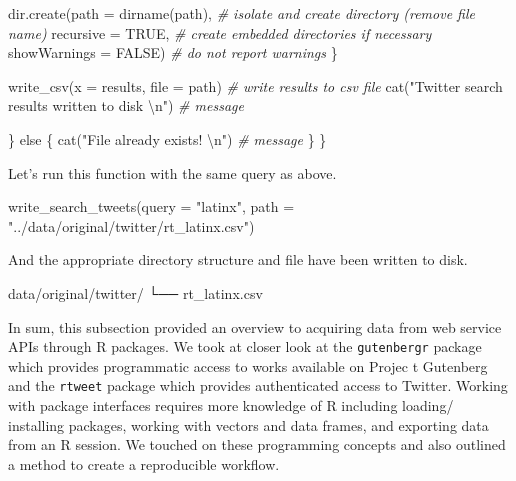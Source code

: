 \documentclass[
  letterpaper,
]{scrbook}
\newenvironment{Shaded}{\begin{snugshade}}{\end{snugshade}}
\newcommand{\AttributeTok}[1]{\textcolor[rgb]{0.00,0.00,0.00}{#1}}
\newcommand{\CommentTok}[1]{\textcolor[rgb]{0.00,0.00,0.00}{\textit{#1}}}
\newcommand{\ConstantTok}[1]{\textcolor[rgb]{0.00,0.00,0.00}{#1}}
\newcommand{\ControlFlowTok}[1]{\textcolor[rgb]{0.00,0.00,0.00}{#1}}
\newcommand{\ExtensionTok}[1]{\textcolor[rgb]{0.00,0.00,0.00}{#1}}
\newcommand{\FunctionTok}[1]{\textcolor[rgb]{0.00,0.00,0.00}{#1}}
\newcommand{\NormalTok}[1]{\textcolor[rgb]{0.00,0.00,0.00}{#1}}
\newcommand{\SpecialCharTok}[1]{\textcolor[rgb]{0.00,0.00,0.00}{#1}}
\newcommand{\StringTok}[1]{\textcolor[rgb]{0.00,0.00,0.00}{#1}}
\begin{document}
\begin{Shaded}
\begin{Highlighting}[]
        \FunctionTok{dir.create}\NormalTok{(}\AttributeTok{path =} \FunctionTok{dirname}\NormalTok{(path), }\CommentTok{\# isolate and create directory (remove file name)}
                   \AttributeTok{recursive =} \ConstantTok{TRUE}\NormalTok{, }\CommentTok{\# create embedded directories if necessary}
                   \AttributeTok{showWarnings =} \ConstantTok{FALSE}\NormalTok{) }\CommentTok{\# do not report warnings}
\NormalTok{      \}}
      
      \FunctionTok{write\_csv}\NormalTok{(}\AttributeTok{x =}\NormalTok{ results, }\AttributeTok{file =}\NormalTok{ path) }\CommentTok{\# write results to csv file }
      \FunctionTok{cat}\NormalTok{(}\StringTok{"Twitter search results written to disk }\SpecialCharTok{\textbackslash{}n}\StringTok{"}\NormalTok{) }\CommentTok{\# message}
      
\NormalTok{    \} }\ControlFlowTok{else}\NormalTok{ \{}
      \FunctionTok{cat}\NormalTok{(}\StringTok{"File already exists! }\SpecialCharTok{\textbackslash{}n}\StringTok{"}\NormalTok{) }\CommentTok{\# message}
\NormalTok{    \}}
\NormalTok{  \}}
\end{Highlighting}
\end{Shaded}

Let's run this function with the same query as above.

\begin{Shaded}
\begin{Highlighting}[]
\FunctionTok{write\_search\_tweets}\NormalTok{(}\AttributeTok{query =} \StringTok{"latinx"}\NormalTok{, }\AttributeTok{path =} \StringTok{"../data/original/twitter/rt\_latinx.csv"}\NormalTok{)}
\end{Highlighting}
\end{Shaded}

And the appropriate directory structure and file have been written to
disk.

\begin{Shaded}
\begin{Highlighting}[]
\ExtensionTok{data/original/twitter/}
\ExtensionTok{└──}\NormalTok{ rt\_latinx.csv}
\end{Highlighting}
\end{Shaded}

In sum, this subsection provided an overview to acquiring data from web
service APIs through R packages. We took at closer look at the
\texttt{gutenbergr} package which provides programmatic access to works
available on Projec t Gutenberg and the \texttt{rtweet} package which
provides authenticated access to Twitter. Working with package
interfaces requires more knowledge of R including loading/ installing
packages, working with vectors and data frames, and exporting data from
an R session. We touched on these programming concepts and also outlined
a method to create a reproducible workflow.
\end{document}
